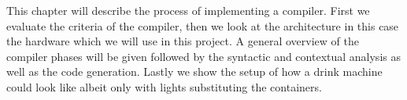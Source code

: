This chapter will describe the process of implementing a compiler. First we evaluate the criteria of the compiler, then we look at the architecture in this case the hardware which we will use in this project. A general overview of the compiler phases will be given followed by the syntactic and contextual analysis as well as the code generation. Lastly we show the setup of how a drink machine could look like albeit only with lights substituting the containers.